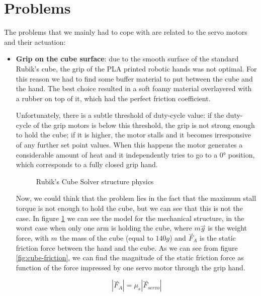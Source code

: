 \documentclass{report}
\begin{document}
\section{Problems}\label{sec:prob}
The problems that we mainly had to cope with are related to the servo motors and their actuation:
\begin{itemize}
    \item \textbf{Grip on the cube surface}: due to the smooth surface of the standard Rubik's cube, the grip of the PLA printed robotic hands was not optimal. For this reason we had to find some buffer material to put between the cube and the hand. The best choice resulted in a soft foamy material overlayered with a rubber on top of it, which had the perfect friction coefficient.
    
    \medskip
    
    Unfortunately, there is a subtle threshold of duty-cycle value: if the duty-cycle of the grip motors is below this threshold, the grip is not strong enough to hold the cube; if it is higher, the motor stalls and it becomes irresponsive of any further set point values. When this happens the motor generates a considerable amount of heat and it independently tries to go to a 0° position, which corresponds to a fully closed grip hand.
    
    \begin{figure}[h]
        \centering
        
        \caption{Rubik's Cube Solver structure physics}
        \label{fig:structure-physics}
    \end{figure} 
    
    Now, we could think that the problem lies in the fact that the maximum stall torque is not enough to hold the cube, but we can see that this is not the case. In figure \ref{fig:structure-physics} we can see the model for the mechanical structure, in the worst case when only one arm is holding the cube, where \(m\overset{\rightharpoonup}{g}\) is the weight force, with \(m\) the mass of the cube (equal to \(140g\)) and \(\overset{\rightharpoonup}{F}_A\) is the static friction force between the hand and the cube. As we can see from figure \ref{fig:cube-friction}, we can find the magnitude of the static friction force as function of the force impressed by one servo motor through the grip hand.

    \begin{equation}\label{eq:friction-eq}
         |\overset{\rightharpoonup}{F}_A|=\mu_s|\overset{\rightharpoonup}{F}_{servo}|
    \end{equation}


\end{itemize}
\end{document}
